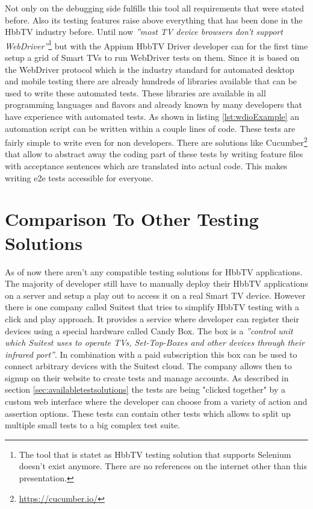 Not only on the debugging side fulfills this tool all requirements that were stated before. Also its testing
features raise above everything that has been done in the HbbTV industry before. Until now \textit{''most TV
device browsers don’t support WebDriver''}\cite{sengo}\footnote{The tool that is statet as HbbTV testing solution
that supports Selenium doesn't exist anymore. There are no references on the internet other than this presentation.}
but with the Appium HbbTV Driver developer can for the first time setup a grid of Smart TVs to run WebDriver
tests on them. Since it is based on the WebDriver protocol which is the industry standard for automated desktop
and mobile testing there are already hundreds of libraries available that can be used to write these automated tests.
These libraries are available in all programming languages and flavors and already known by many developers that
have experience with automated tests. As shown in listing \ref{lst:wdioExample} an automation script can be written
within a couple lines of code. These tests are fairly simple to write even for non developers. There are solutions like
Cucumber\footnote{\url{https://cucumber.io/}} that allow to abstract away the coding part of these tests by writing
feature files with acceptance sentences which are translated into actual code. This makes writing e2e tests accessible
for everyone.

\section{Comparison To Other Testing Solutions\label{sec:businessmodel}}

As of now there aren't any compatible testing solutions for HbbTV applications. The majority of developer still have
to manually deploy their HbbTV applications on a server and setup a play out to access it on a real Smart TV device.
However there is one company called Suitest that tries to simplify HbbTV testing with a click and play approach.
It provides a service where developer can register their devices using a special hardware called Candy Box. The box
is a \textit{''control unit which Suitest uses to operate TVs, Set-Top-Boxes and other devices through their infrared
port''}\cite{candybox}. In combination with a paid subscription this box can be used to connect arbitrary devices
with the Suitest cloud. The company allows then to signup on their website to create tests and manage accounts.
As described in section \ref{sec:availabletestsolutions} the tests are being "clicked together" by a custom web interface
where the developer can choose from a variety of action and assertion options. These tests can contain other tests
which allows to split up multiple small tests to a big complex test suite.

